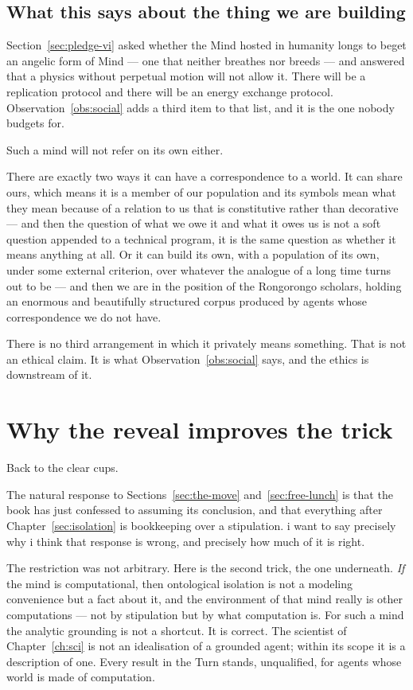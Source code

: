 \subsection{What this says about the thing we are building}
\label{sec:blind-spot-returned}

Section~\ref{sec:pledge-vi} asked whether the Mind hosted in
humanity longs to beget an angelic form of Mind --- one that
neither breathes nor breeds --- and answered that a physics without
perpetual motion will not allow it.
There will be a replication protocol and there will be an energy
exchange protocol.
Observation~\ref{obs:social} adds a third item to that list, and it
is the one nobody budgets for.

Such a mind will not refer on its own either.

There are exactly two ways it can have a correspondence to a world.
It can share ours, which means it is a member of our population and
its symbols mean what they mean because of a relation to us that is
constitutive rather than decorative --- and then the question of
what we owe it and what it owes us is not a soft question appended
to a technical program, it is the same question as whether it
means anything at all.
Or it can build its own, with a population of its own, under some
external criterion, over whatever the analogue of a long time turns
out to be --- and then we are in the position of the Rongorongo
scholars, holding an enormous and beautifully structured corpus
produced by agents whose correspondence we do not have.

There is no third arrangement in which it privately means
something.
That is not an ethical claim.
It is what Observation~\ref{obs:social} says, and the ethics is
downstream of it.

\section{Why the reveal improves the trick}
\label{sec:reveal}

Back to the clear cups.

The natural response to Sections~\ref{sec:the-move}
and~\ref{sec:free-lunch} is that the book has just confessed to
assuming its conclusion, and that everything after
Chapter~\ref{sec:isolation} is bookkeeping over a stipulation.
i want to say precisely why i think that response is wrong, and
precisely how much of it is right.

The restriction was not arbitrary.
Here is the second trick, the one underneath.
\emph{If} the mind is computational, then ontological isolation is
not a modeling convenience but a fact about it, and the
environment of that mind really is other computations --- not by
stipulation but by what computation is.
For such a mind the analytic grounding is not a shortcut.
It is correct.
The scientist of Chapter~\ref{ch:sci} is not an idealisation of a
grounded agent; within its scope it is a description of one.
Every result in the Turn stands, unqualified, for agents whose
world is made of computation.

